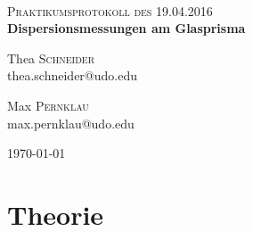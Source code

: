 

\newcommand{\HRule}{\rule{\linewidth}{0.5mm}}


\begin{titlepage}
\begin{center}

~\\[1cm]


\textsc{\Large Praktikumsprotokoll des 19.04.2016}\\

\huge{ \bfseries Dispersionsmessungen am Glasprisma}\\[1em]


\begin{minipage}{0.4\textwidth}
\begin{flushleft} \large
Thea \textsc{Schneider}\\
thea.schneider@udo.edu
\end{flushleft}
\end{minipage}
\begin{minipage}{0.4\textwidth}
\begin{flushright} \large
Max \textsc{Pernklau}\\
max.pernklau@udo.edu
\end{flushright}
\end{minipage}

\vfill

{\large \today}

\end{center}
\end{titlepage}


\thispagestyle{empty}



\begingroup
\renewcommand{\clearpage}{}
\section{Theorie}
\label{sec:Theorie}
\endgroup









